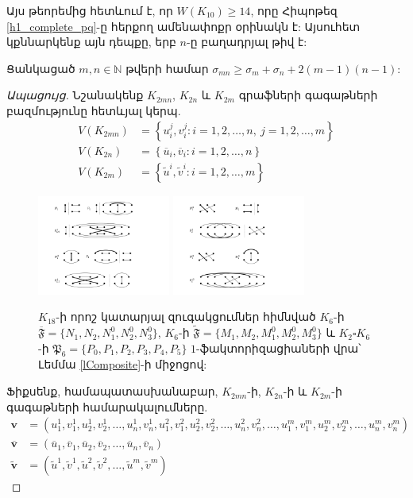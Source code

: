 Այս թեորեմից հետևում է, որ $W(K_{10}) \geq 14$, որը Հիպոթեզ \ref{h1_complete_pq}-ը հերքող ամենափոքր օրինակն է: Այսուհետ կքննարկենք այն դեպքը, երբ $n$-ը բաղադրյալ թիվ է:

\begin{lemma}\label{lComposite}
Ցանկացած $m,n \in\mathbb{N}$ թվերի համար $\sigma_{mn} \geq \sigma_m + \sigma_n + 2(m-1)(n-1)$:
\end{lemma}
\begin{proof}[Ապացույց]
Նշանակենք $K_{2mn}$, $K_{2n}$ և $K_{2m}$ գրաֆների գագաթների բազմությունը հետևյալ կերպ.
\begin{align*}
V(K_{2mn}) &= \left\{u_i^j,v_i^j : i=1,2,\ldots,n,\ j=1,2,\ldots,m\right\} \\
V(K_{2n}) &= \left\{\overline{u}_i,\overline{v}_i : i=1,2,\ldots,n \right\} \\ 
V(K_{2m}) &= \left\{\widetilde{u}^i,\widetilde{v}^i : i=1,2,\ldots,m \right\} 
\end{align*}


\begin{figure}[t!]
\centering
\includegraphics[width=0.39\textwidth]{figures/K_18-1.pdf}
\hspace{1cm}
\includegraphics[width=0.39\textwidth]{figures/K_18-2.pdf}
\caption{$K_{18}$-ի որոշ կատարյալ զուգակցումներ հիմնված $K_6$-ի $\overline{\mathfrak{F}}=\{N_1,N_2,N_1^0,N_2^0,N_3^0\}$, $K_6$-ի $\widetilde{\mathfrak{F}}=\{M_1,M_2,M_1^0,M_2^0,M_3^0\}$ և $K_2\square K_6$-ի $\mathfrak{P}_6=\{P_0,P_1,P_2,P_3,P_4,P_5\}$ $1$-ֆակտորիզացիաների վրա՝ Լեմմա \ref{lComposite}-ի միջոցով:}
\label{K_18matchings}
\end{figure}


Ֆիքսենք, համապատասխանաբար, $K_{2mn}$-ի, $K_{2n}$-ի և $K_{2m}$-ի գագաթների համարակալումները.
\begin{align*}
\mathbf{v} &= \left(
u^1_1,v^1_1,u^1_2,v^1_2, \ldots, u^1_n,v^1_n,
u^2_1,v^2_1,u^2_2,v^2_2, \ldots, u^2_n,v^2_n, \ldots, 
u^m_1,v^m_1,u^m_2,v^m_2, \ldots, u^m_n,v^m_n \right) \\
\overline{\mathbf{v}} &= \left(
\overline{u}_1,\overline{v}_1,\overline{u}_2,\overline{v}_2, \ldots, \overline{u}_n,\overline{v}_n\right)\\
\widetilde{\mathbf{v}} &= \left(
\widetilde{u}^1,\widetilde{v}^1,\widetilde{u}^2,\widetilde{v}^2, \ldots, \widetilde{u}^m,\widetilde{v}^m\right)
\end{align*}


\end{proof}
